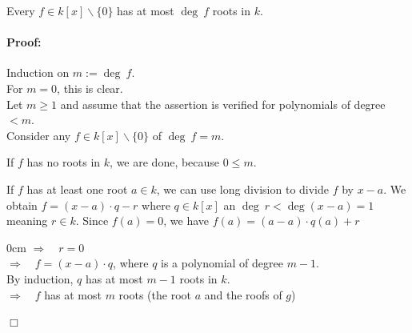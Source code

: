 \begin{corollary}[title = Corollary 1.5.3]
    Every $f \in k[x]\backslash\{0\}$ has at most $\deg \ f$ roots in $k$. 

    \paragraph{Proof:} Induction on $m := \deg \ f$.  \\[0.3em]
    For $m = 0$, this is clear.  \\[0.3em]
    Let $m \geq 1$ and assume that the assertion is verified for polynomials of degree $< m$. \\[0.3em]
    Consider any $f \in k[x]\backslash\{0\}$ of $\deg \ f= m$.  
    
    If $f$ has no roots in $k$, we are done, because $0\leq m$. 

    If $f$ has at least one root $a \in k$, we can use long division to divide $f$ by $x -a$. We obtain $f = (x-a) \cdot q - r$ where $q \in k[x]$ an $\deg \ r < \deg(x-a) =1$ 
    meaning $r \in k$. 
    Since $f(a) = 0$, we have $f(a) = (a -a) \cdot q(a) + r$ 
    \begin{addmargin}[0.6cm]{0cm}  
        $\Rightarrow \quad r = 0$ \\
        $\Rightarrow \quad f = (x-a) \cdot q$, where $q$ is a polynomial of degree $m -1$. \\
        \hspace*{0.8cm}By induction, $q$ has at most $m -1$ roots in $k$. \\
        $\Rightarrow \quad f$ has at most $m$ roots (the root $a$ and the roofs of $g$) 
    \end{addmargin}

    \begin{flushright}
      $\Box $
    \end{flushright}
\end{corollary}


